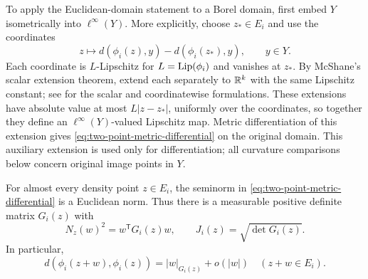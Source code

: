 To apply the Euclidean-domain statement to a Borel domain, first embed
\(Y\) isometrically into \(\ell^\infty(Y)\). More explicitly, choose
\(z_*\in E_i\) and use the coordinates
\[
 z\longmapsto d(\phi_i(z),y)-d(\phi_i(z_*),y),\qquad y\in Y.
\]
Each coordinate is \(L\)-Lipschitz for \(L=\operatorname{Lip}(\phi_i)\) and vanishes
at \(z_*\). By McShane's scalar extension theorem, extend each separately
to \(\mathbb R^k\) with the same Lipschitz constant; see
\cite[Theorem~2.1 and Proposition~2.2]{Rieffel2006} for the scalar and
coordinatewise formulations. These extensions have absolute value at most
\(L|z-z_*|\), uniformly over the coordinates, so together they define
an \(\ell^\infty(Y)\)-valued Lipschitz map. Metric differentiation of
this extension gives \eqref{eq:two-point-metric-differential} on the
original domain. This auxiliary extension is used only for differentiation;
all curvature comparisons below concern original image points in \(Y\).

\begin{lemma}
\label{lem:euclidean-chart-metrics}
For almost every density point \(z\in E_i\), the seminorm in
\eqref{eq:two-point-metric-differential} is a Euclidean norm. Thus there
is a measurable positive definite matrix \(G_i(z)\) with
\begin{equation}
\label{eq:chart-metric}
 N_z(w)^2=w^{\mathsf T}G_i(z)w,
 \qquad J_i(z)=\sqrt{\det G_i(z)}.
\end{equation}
In particular,
\begin{equation}
\label{eq:centered-metric-differential}
 d(\phi_i(z+w),\phi_i(z))=|w|_{G_i(z)}+o(|w|)
 \quad (z+w\in E_i).
\end{equation}
\end{lemma}

